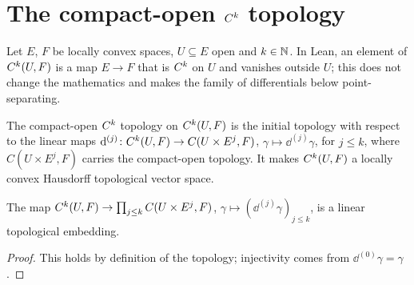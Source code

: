 \section{The compact-open \texorpdfstring{$C^{k}$}{Ck} topology}
\label{sec:ck-topology}

Let $E$, $F$ be locally convex spaces, $U \subseteq E$ open and $k \in \mathbb{N}$. In Lean, an element
of $C^{k}(U, F)$ is a map $E \to F$ that is $C^{k}$ on $U$ and vanishes outside $U$; this does
not change the mathematics and makes the family of differentials below point-separating.

\begin{definition}
  \label{def:ck-topology}
  \leanok
  The compact-open $C^{k}$ topology on $C^{k}(U, F)$ is the initial topology with respect to
  the linear maps $\mathrm{d}^{(j)} \colon C^{k}(U, F) \to C(U \times E^j, F)$,
  $\gamma \mapsto \dd^{(j)}\gamma$, for $j \leq k$, where $C(U \times E^j, F)$ carries the
  compact-open topology. It makes $C^{k}(U, F)$ a locally convex Hausdorff topological vector
  space.
\end{definition}

\begin{lemma}
  \label{lem:ck-embedding}
  \leanok
  The map $C^{k}(U, F) \to \prod_{j \leq k} C(U \times E^j, F)$,
  $\gamma \mapsto (\dd^{(j)}\gamma)_{j \leq k}$, is a linear topological embedding.
\end{lemma}

\begin{proof}
  \leanok
  This holds by definition of the topology; injectivity comes from $\dd^{(0)}\gamma = \gamma$.
\end{proof}

